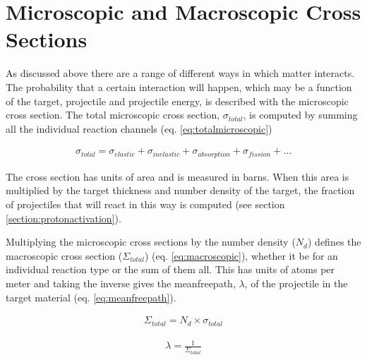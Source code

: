 \FloatBarrier






\section{Microscopic and Macroscopic Cross Sections}

As discussed above there are a range of different ways in which matter interacts.  The probability that a certain interaction will happen, which may be a function of the target, projectile and projectile energy, is described with the microscopic cross section.  The total microscopic cross section, $\sigma_{total}$, is computed by summing all the individual reaction channels (eq. \ref{eq:totalmicroscopic})

\begin{equation}
\begin{split}
\sigma_{total} = \sigma_{elastic} + \sigma_{inelastic} + \sigma_{absorption} + \sigma_{fission} + \dots
\end{split}
\label{eq:totalmicroscopic}
\end{equation}

The cross section has units of area and is measured in \gls{barn}s.  When this area is multiplied by the target thickness and number density of the target, the fraction of projectiles that will react in this way is computed (see section \ref{section:protonactivation}).

Multiplying the microscopic cross sections by the number density ($N_{d}$) defines the macroscopic cross section ($\Sigma_{total}$) (eq. \ref{eq:macroscopic}), whether it be for an individual reaction type or the sum of them all.  This has units of atoms per meter and taking the inverse gives the \gls{meanfreepath}, $\lambda$, of the projectile in the target material (eq. \ref{eq:meanfreepath}).

\begin{equation}
\begin{split}
\Sigma_{total} = N_{d} \times \sigma_{total}
\end{split}
\label{eq:macroscopic}
\end{equation}

\begin{equation}
\begin{split}
\lambda = \frac{1}{\Sigma_{total}}
\end{split}
\label{eq:meanfreepath}
\end{equation}

